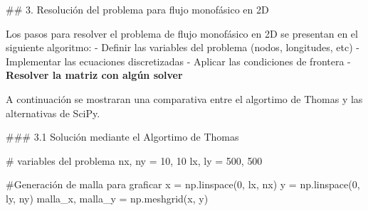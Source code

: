 \documentclass[
  letterpaper,
  DIV=11,
  numbers=noendperiod]{scrreprt}
\newenvironment{Shaded}{\begin{snugshade}}{\end{snugshade}}
\newcommand{\CommentTok}[1]{\textcolor[rgb]{0.37,0.37,0.37}{#1}}
\newcommand{\DecValTok}[1]{\textcolor[rgb]{0.68,0.00,0.00}{#1}}
\newcommand{\NormalTok}[1]{\textcolor[rgb]{0.00,0.23,0.31}{#1}}
\newcommand{\OperatorTok}[1]{\textcolor[rgb]{0.37,0.37,0.37}{#1}}
\begin{document}
\#\# 3. Resolución del problema para flujo monofásico en 2D

Los pasos para resolver el problema de flujo monofásico en 2D se
presentan en el siguiente algoritmo: - Definir las variables del
problema (nodos, longitudes, etc) - Implementar las ecuaciones
discretizadas - Aplicar las condiciones de frontera - \textbf{Resolver
la matriz con algún solver}

A continuación se mostraran una comparativa entre el algortimo de Thomas
y las alternativas de SciPy.

\#\#\# 3.1 Solución mediante el Algortimo de Thomas

\begin{Shaded}
\begin{Highlighting}[]
\CommentTok{\# variables del problema}
\NormalTok{nx, ny }\OperatorTok{=} \DecValTok{10}\NormalTok{, }\DecValTok{10}
\NormalTok{lx, ly }\OperatorTok{=} \DecValTok{500}\NormalTok{, }\DecValTok{500}

\CommentTok{\#Generación de malla para graficar}
\NormalTok{x }\OperatorTok{=}\NormalTok{ np.linspace(}\DecValTok{0}\NormalTok{, lx, nx)}
\NormalTok{y }\OperatorTok{=}\NormalTok{ np.linspace(}\DecValTok{0}\NormalTok{, ly, ny)}
\NormalTok{malla\_x, malla\_y }\OperatorTok{=}\NormalTok{ np.meshgrid(x, y)}
\end{Highlighting}
\end{Shaded}
\end{document}
